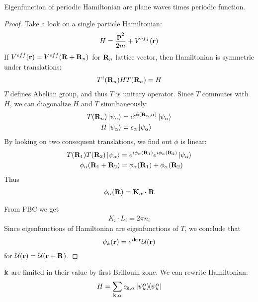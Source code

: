 \begin{theorem}
	Eigenfunction of periodic Hamiltonian are plane waves times periodic function.
\begin{proof}
	Take a look on a single particle Hamiltonian:
	\begin{align}
	H = \frac{\vb{p}^2}{2m} + V^{eff} (\vb{r})
	\end{align}
	If $V^{eff}(\vb{r}) = V^{eff}(\vb{R} + \vb{R}_n)$ for $\vb{R}_n$ lattice vector, then Hamiltonian is symmetric under translations:
	\begin{align}
	T^\dagger(\vb{R}_n) H T(\vb{R}_n) = H
	\end{align}
	$T$ defines Abelian group, and thus $T$ is unitary operator. Since $T$ commutes with $H$, we can diagonalize $H$ and $T$ simultaneously:
	\begin{align}
	T(\vb{R}_n) \ket{\psi_\alpha} &= e^{i \phi(\vb{R}_n, \alpha)} \ket{\psi_\alpha}\\
	H \ket{\psi_\alpha} &= \epsilon_\alpha \ket{\psi_\alpha}\
	\end{align}
	By looking on two consequent translations, we find out $\phi$ is linear:
	\begin{align}
	T(\vb{R}_1)T(\vb{R}_2) \ket{\psi_\alpha} &= e^{i \phi_\alpha(\vb{R}_1)}e^{i \phi_\alpha(\vb{R}_2)} \ket{\psi_\alpha}\\
	\phi_\alpha(\vb{R}_1 + \vb{R}_2) &=\phi_\alpha(\vb{R}_1) + \phi_\alpha(\vb{R}_2)
	\end{align}
	Thus 
	\begin{align}
	\phi_\alpha(\vb{R}) = \vb{K}_\alpha \vdot \vb{R}
	\end{align}
	
	From PBC we get
	\begin{align}
	K_i \cdot L_i = 2\pi n_i 
	\end{align}
	Since eigenfunctions of Hamiltonian are eigenfunctions of $T$, we conclude that 
	\begin{align}
	\psi_k(\vb{r}) = e^{i \vb{k} \vdot \vb{r}} \mathcal{U}(\vb{r})
	\end{align}
	for $\mathcal{U}(\vb{r}) = \mathcal{U}(\vb{r}+\vb{R})$.
\end{proof}
\end{theorem}

$\vb{k}$ are limited in their value by first Brillouin zone. We can rewrite Hamiltonian:
\begin{align}
H = \sum_{\vb{k}, \alpha} \epsilon_{\vb{k}, \alpha} \dyad{\psi_k^\alpha}
\end{align}

